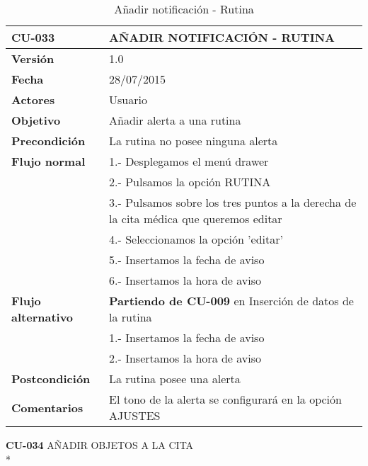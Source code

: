 \documentclass[../pfc.tex]{subfiles}
\begin{document}
	\begin{table}[H]
		\centering
		\begin{tabular}[t]{|p{3cm}|p{9.5cm}|}
			\hline \textbf{CU-033} & \textbf{AÑADIR NOTIFICACIÓN - RUTINA} \\*
			\hline\hline \textbf{Versión} & 1.0 \\*
			\hline\hline \textbf{Fecha} & 28/07/2015 \\*
			\hline\textbf{Actores} 	& Usuario\\*
			\hline \textbf{Objetivo} & Añadir alerta a una rutina\\* 			
			\hline \textbf{Precondición} & La rutina no posee ninguna alerta\\* 
			\hline \textbf{Flujo normal} & 1.- Desplegamos el menú drawer \\* 
			& 2.- Pulsamos la opción RUTINA\\*	
			& 3.- Pulsamos sobre los tres puntos a la derecha de la cita médica que queremos editar\\*	
			& 4.- Seleccionamos la opción 'editar'\\*	
			& 5.- Insertamos la fecha de aviso\\*
			& 6.- Insertamos la hora de aviso\\*
			\hline \textbf{Flujo alternativo} & \textbf{Partiendo de CU-009} en Inserción de datos de la rutina\\*  
			& 1.- Insertamos la fecha de aviso\\*
			& 2.- Insertamos la hora de aviso\\*
			\hline \textbf{Postcondición} & La rutina posee una alerta\\* 
			\hline \textbf{Comentarios}   & El tono de la alerta se configurará en la opción AJUSTES\\*
			\hline
		\end{tabular}
		\caption{Añadir notificación - Rutina}
		\label{tabla:caso033}
	\end{table}		
	
	\textbf{CU-034}	AÑADIR OBJETOS A LA CITA\\*
\end{document}
